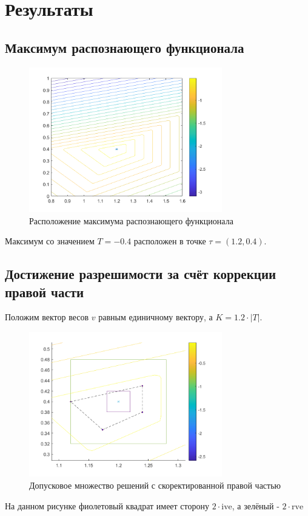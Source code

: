 \section{Результаты}
\subsection{Максимум распознающего функционала}
\begin{figure}[H]
\centering
\includegraphics[width=0.75\textwidth]{Graphics/maxTol.png}
\caption{Расположение максимума распознающего функционала} 
\end{figure}
Максимум со значением $T=-0.4$ расположен в точке $\tau=(1.2,0.4)$.
\subsection{Достижение разрешимости за счёт коррекции правой части}
Положим вектор весов $v$ равным единичному вектору, а $K=1.2\cdot |T|$.
\begin{figure}[H]
\centering
\includegraphics[width=0.75\textwidth]{Graphics/biasCorr.png}
\caption{Допусковое множество решений с скоректированной правой частью} 
\end{figure}
\noindent На данном рисунке фиолетовый квадрат имеет сторону $2\cdot \mathrm{ive}$, а зелёный - $2\cdot \mathrm{rve}$

